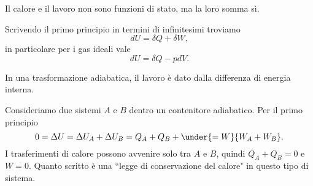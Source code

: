 \begin{remark}
Il calore e il lavoro non sono funzioni di stato, ma la loro somma s\`i.
\end{remark}

\begin{remark}
Scrivendo il primo principio in termini di infinitesimi troviamo
\[dU=\delta Q+\delta W,\]
in particolare per i gas ideali vale
\[dU=\delta Q-pdV.\]
\end{remark}

\begin{remark}
In una trasformazione adiabatica, il lavoro \`e dato dalla differenza di energia interna.
\end{remark}
\begin{example}
Consideriamo due sistemi $A$ e $B$ dentro un contenitore adiabatico. Per il primo principio
\[0=\Delta U=\Delta U_A+\Delta U_B=Q_A+Q_B+\under{=W}{W_A+W_B}.\]
I trasferimenti di calore possono avvenire solo tra $A$ e $B$, quindi $Q_A+Q_B=0$ e $W=0$. Quanto scritto \`e una ``legge di conservazione del calore" in questo tipo di sistema.
\end{example}